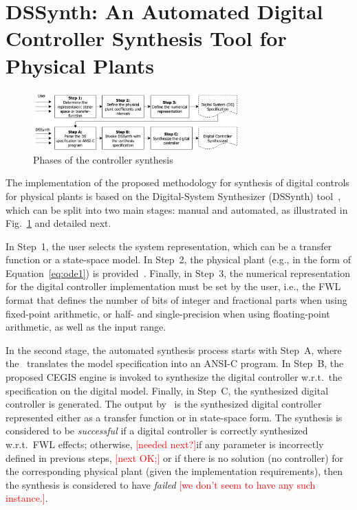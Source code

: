 \documentclass[twocolumn]{autart}    %
\renewcommand{\note}[1]{\textcolor{red}{[#1]}}
\begin{document}
\fi

\section{DSSynth: An Automated Digital Controller Synthesis Tool for Physical Plants}
\label{sec:dssynthtool}

\begin{figure}[t]
\centering
\includegraphics[width=0.7\textwidth]{figures/synthesis-flow.pdf}
\caption{Phases of the controller synthesis}
\label{fig:synthesis-flow}
\end{figure}

The implementation of the proposed methodology for synthesis of digital controls for physical plants is based on the Digital-System Synthesizer 
(DSSynth) tool~\cite{DBLP:conf/kbse/AbateBCCCDKKP17}, 
which can be split into two main stages: manual and automated, as illustrated in Fig.~\ref{fig:synthesis-flow} and detailed next. 

In Step~1, the user selects the system representation, which can be a transfer function or a state-space model.  
In Step~2, the physical plant (e.g., in the form of Equation~\eqref{eq:ode1}) is provided~\cite{astrom1997computer}.  
Finally, in Step~3, the numerical representation for the digital controller implementation must be set by the user, i.e., 
the FWL format that defines the number of bits of integer and fractional parts when using fixed-point arithmetic, 
or half- and single-precision when using floating-point arithmetic, 
as well as the input range.  

In the second stage, 
the automated synthesis process starts with Step~A, where the
\tool~translates the model specification into an ANSI-C program.  
In Step~B, the proposed CEGIS engine is invoked to synthesize the digital controller w.r.t.~the specification on the digital model.  
Finally, in Step~C, the synthesized digital controller is generated.  
The output by \tool~is the synthesized digital controller represented either as a transfer function or in state-space form.  
The synthesis is considered to be \emph{successful} if a digital controller is
correctly synthesized w.r.t.~FWL effects; otherwise, \note{needed next?}if any parameter is
incorrectly defined in previous steps, \note{next OK;} or if there is no solution (no
controller) for the corresponding physical plant (given the implementation
requirements), then the synthesis is considered to have \emph{failed} \note{we don't seem to have any such instance.}.
\end{document}

